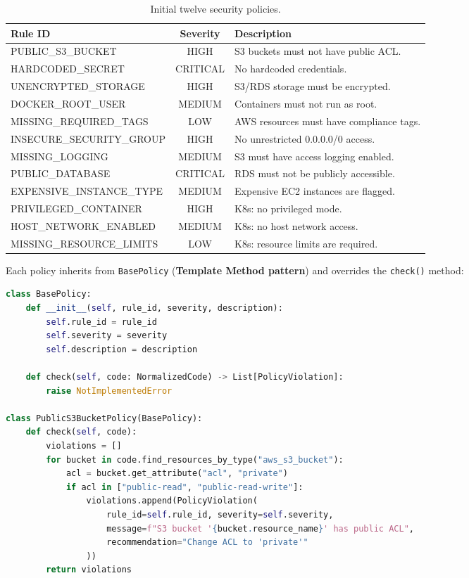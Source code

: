 \begin{table}[H]
\centering
\begin{tabularx}{\textwidth}{|l|c|X|}
\hline
\textbf{Rule ID} & \textbf{Severity} & \textbf{Description} \\
\hline
PUBLIC\_S3\_BUCKET          & HIGH     & S3 buckets must not have public ACL. \\
\hline
HARDCODED\_SECRET           & CRITICAL & No hardcoded credentials. \\
\hline
UNENCRYPTED\_STORAGE        & HIGH     & S3/RDS storage must be encrypted. \\
\hline
DOCKER\_ROOT\_USER          & MEDIUM   & Containers must not run as root. \\
\hline
MISSING\_REQUIRED\_TAGS     & LOW      & AWS resources must have compliance tags. \\
\hline
INSECURE\_SECURITY\_GROUP   & HIGH     & No unrestricted 0.0.0.0/0 access. \\
\hline
MISSING\_LOGGING            & MEDIUM   & S3 must have access logging enabled. \\
\hline
PUBLIC\_DATABASE             & CRITICAL & RDS must not be publicly accessible. \\
\hline
EXPENSIVE\_INSTANCE\_TYPE   & MEDIUM   & Expensive EC2 instances are flagged. \\
\hline
PRIVILEGED\_CONTAINER       & HIGH     & K8s: no privileged mode. \\
\hline
HOST\_NETWORK\_ENABLED      & MEDIUM   & K8s: no host network access. \\
\hline
MISSING\_RESOURCE\_LIMITS   & LOW      & K8s: resource limits are required. \\
\hline
\end{tabularx}
\caption{Initial twelve security policies.}
\label{tab:s1-policies}
\end{table}

Each policy inherits from \texttt{BasePolicy} (\textbf{Template Method pattern}) and overrides the \texttt{check()} method:

\begin{lstlisting}[language=Python, caption={BasePolicy and a concrete policy example.}, label={lst:basepolicy}]
class BasePolicy:
    def __init__(self, rule_id, severity, description):
        self.rule_id = rule_id
        self.severity = severity
        self.description = description

    def check(self, code: NormalizedCode) -> List[PolicyViolation]:
        raise NotImplementedError

class PublicS3BucketPolicy(BasePolicy):
    def check(self, code):
        violations = []
        for bucket in code.find_resources_by_type("aws_s3_bucket"):
            acl = bucket.get_attribute("acl", "private")
            if acl in ["public-read", "public-read-write"]:
                violations.append(PolicyViolation(
                    rule_id=self.rule_id, severity=self.severity,
                    message=f"S3 bucket '{bucket.resource_name}' has public ACL",
                    recommendation="Change ACL to 'private'"
                ))
        return violations
\end{lstlisting}


